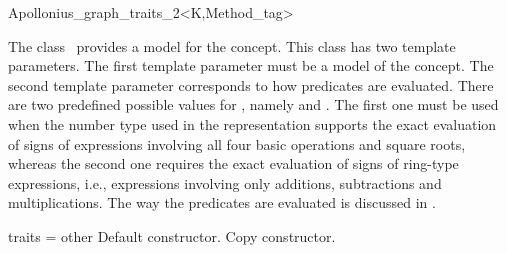 

\begin{ccRefClass}{Apollonius_graph_traits_2<K,Method_tag>}

\ccDefinition
  
The class \ccRefName\ provides a model for the
 concept.
This class has two template parameters. The first template parameter
must be a model of the  concept. The second template
parameter corresponds to how predicates are evaluated. There are two
predefined possible values for , namely
 and . The first one
must be used when the number type used in the representation supports
the exact evaluation of signs of expressions involving all four basic
operations and square roots, whereas the second one requires the exact
evaluation of signs of ring-type expressions, i.e., expressions
involving only additions, subtractions and multiplications. 
%
The way the predicates are evaluated is discussed in
\cite{ke-ppawv-02,ke-rctac-03}.



\ccIsModel
{}

\ccCreation
{}
{traits = other}{}
\ccThreeToTwo
%
	      {Default constructor.}
\ccGlue
{}
{Copy constructor.}
\ccGlue
{}


\ccSeeAlso
{}\\
 \\
\\
\\


\end{ccRefClass}


